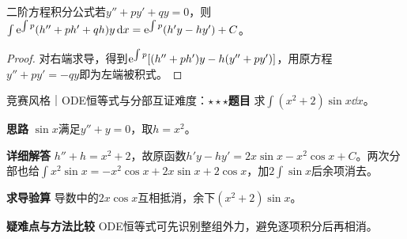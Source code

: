 \begin{theorem}{二阶方程积分公式}若$y''+py'+qy=0$，则$\int \mathrm{e}^{\int p}(h''+ph'+qh)y\mathop{}\!\mathrm{d} x=\mathrm{e}^{\int p}(h'y-hy')+C$。\end{theorem}\begin{proof}对右端求导，得到$\mathrm{e}^{\int p}[(h''+ph')y-h(y''+py')]$，用原方程$y''+py'=-qy$即为左端被积式。\end{proof}

\begin{example}{竞赛风格｜ODE恒等式与分部互证}{难度：$\star\star\star$}\label{ic:ex:indefinite_algebra_complete:ode_sine}\textbf{题目} 求$\int(x^2+2)\sin x\dd x$。\par \textbf{思路} $\sin x$满足$y''+y=0$，取$h=x^2$。\par \textbf{详细解答} $h''+h=x^2+2$，故原函数$h'y-hy'=2x\sin x-x^2\cos x+C$。两次分部也给$\int x^2\sin x=-x^2\cos x+2x\sin x+2\cos x$，加$2\int\sin x$后余项消去。\par \textbf{求导验算} 导数中的$2x\cos x$互相抵消，余下$(x^2+2)\sin x$。\par \textbf{疑难点与方法比较} ODE恒等式可先识别整组外力，避免逐项积分后再相消。\end{example}
